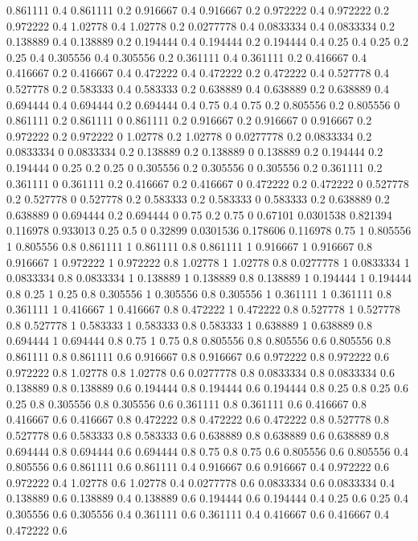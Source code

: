 0.861111 0.4
0.861111 0.2
0.916667 0.4
0.916667 0.2
0.972222 0.4
0.972222 0.2
0.972222 0.4
1.02778 0.4
1.02778 0.2
0.0277778 0.4
0.0833334 0.4
0.0833334 0.2
0.138889 0.4
0.138889 0.2
0.194444 0.4
0.194444 0.2
0.194444 0.4
0.25 0.4
0.25 0.2
0.25 0.4
0.305556 0.4
0.305556 0.2
0.361111 0.4
0.361111 0.2
0.416667 0.4
0.416667 0.2
0.416667 0.4
0.472222 0.4
0.472222 0.2
0.472222 0.4
0.527778 0.4
0.527778 0.2
0.583333 0.4
0.583333 0.2
0.638889 0.4
0.638889 0.2
0.638889 0.4
0.694444 0.4
0.694444 0.2
0.694444 0.4
0.75 0.4
0.75 0.2
0.805556 0.2
0.805556 0
0.861111 0.2
0.861111 0
0.861111 0.2
0.916667 0.2
0.916667 0
0.916667 0.2
0.972222 0.2
0.972222 0
1.02778 0.2
1.02778 0
0.0277778 0.2
0.0833334 0.2
0.0833334 0
0.0833334 0.2
0.138889 0.2
0.138889 0
0.138889 0.2
0.194444 0.2
0.194444 0
0.25 0.2
0.25 0
0.305556 0.2
0.305556 0
0.305556 0.2
0.361111 0.2
0.361111 0
0.361111 0.2
0.416667 0.2
0.416667 0
0.472222 0.2
0.472222 0
0.527778 0.2
0.527778 0
0.527778 0.2
0.583333 0.2
0.583333 0
0.583333 0.2
0.638889 0.2
0.638889 0
0.694444 0.2
0.694444 0
0.75 0.2
0.75 0
0.67101 0.0301538
0.821394 0.116978
0.933013 0.25
0.5 0
0.32899 0.0301536
0.178606 0.116978
0.75 1
0.805556 1
0.805556 0.8
0.861111 1
0.861111 0.8
0.861111 1
0.916667 1
0.916667 0.8
0.916667 1
0.972222 1
0.972222 0.8
1.02778 1
1.02778 0.8
0.0277778 1
0.0833334 1
0.0833334 0.8
0.0833334 1
0.138889 1
0.138889 0.8
0.138889 1
0.194444 1
0.194444 0.8
0.25 1
0.25 0.8
0.305556 1
0.305556 0.8
0.305556 1
0.361111 1
0.361111 0.8
0.361111 1
0.416667 1
0.416667 0.8
0.472222 1
0.472222 0.8
0.527778 1
0.527778 0.8
0.527778 1
0.583333 1
0.583333 0.8
0.583333 1
0.638889 1
0.638889 0.8
0.694444 1
0.694444 0.8
0.75 1
0.75 0.8
0.805556 0.8
0.805556 0.6
0.805556 0.8
0.861111 0.8
0.861111 0.6
0.916667 0.8
0.916667 0.6
0.972222 0.8
0.972222 0.6
0.972222 0.8
1.02778 0.8
1.02778 0.6
0.0277778 0.8
0.0833334 0.8
0.0833334 0.6
0.138889 0.8
0.138889 0.6
0.194444 0.8
0.194444 0.6
0.194444 0.8
0.25 0.8
0.25 0.6
0.25 0.8
0.305556 0.8
0.305556 0.6
0.361111 0.8
0.361111 0.6
0.416667 0.8
0.416667 0.6
0.416667 0.8
0.472222 0.8
0.472222 0.6
0.472222 0.8
0.527778 0.8
0.527778 0.6
0.583333 0.8
0.583333 0.6
0.638889 0.8
0.638889 0.6
0.638889 0.8
0.694444 0.8
0.694444 0.6
0.694444 0.8
0.75 0.8
0.75 0.6
0.805556 0.6
0.805556 0.4
0.805556 0.6
0.861111 0.6
0.861111 0.4
0.916667 0.6
0.916667 0.4
0.972222 0.6
0.972222 0.4
1.02778 0.6
1.02778 0.4
0.0277778 0.6
0.0833334 0.6
0.0833334 0.4
0.138889 0.6
0.138889 0.4
0.138889 0.6
0.194444 0.6
0.194444 0.4
0.25 0.6
0.25 0.4
0.305556 0.6
0.305556 0.4
0.361111 0.6
0.361111 0.4
0.416667 0.6
0.416667 0.4
0.472222 0.6
